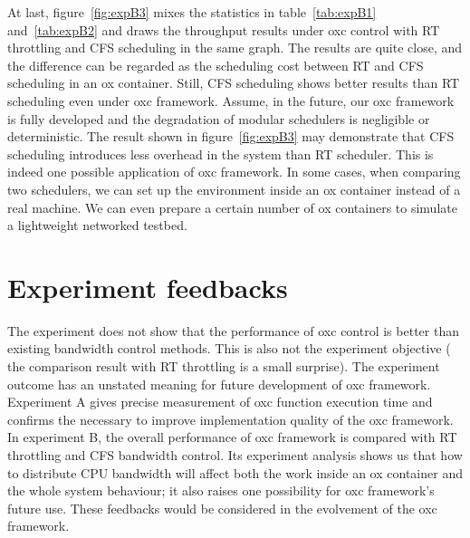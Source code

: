 At last, figure~\ref{fig:expB3} mixes the statistics in table~\ref{tab:expB1}
and~\ref{tab:expB2} and draws the throughput results under oxc control with
RT throttling and CFS scheduling in the same graph.
The results are quite close, and the difference can be regarded as
the scheduling cost between RT and CFS scheduling in an ox container.
Still, CFS scheduling shows better results than RT scheduling even under 
oxc framework. 
Assume, in the future, our oxc framework is fully developed and the 
degradation of modular schedulers is negligible or deterministic. 
The result shown in figure~\ref{fig:expB3} may demonstrate that CFS 
scheduling introduces less overhead in the system than RT scheduler. 
This is indeed one possible application of oxc framework. In some 
cases, when comparing two schedulers, we can set up the environment 
inside an ox container instead of a real machine. We can even prepare 
a certain number of ox containers to simulate a lightweight networked 
testbed. 

\section{Experiment feedbacks}

The experiment does not show that the performance of oxc control is 
better than existing bandwidth control methods. This is also not the 
experiment objective ( the comparison result with RT throttling is a 
small surprise). The experiment outcome has an unstated meaning for 
future development of oxc framework. Experiment A gives precise 
measurement of oxc function execution time and confirms the necessary 
to improve implementation quality of the oxc framework.
In experiment B, the overall performance of oxc framework is compared 
with RT throttling and CFS bandwidth control. Its experiment analysis 
shows us that how to distribute CPU bandwidth will affect both the work 
inside an ox container and the whole system behaviour; it also raises 
one possibility for oxc framework's future use. These feedbacks would 
be considered in the evolvement of the oxc framework.

